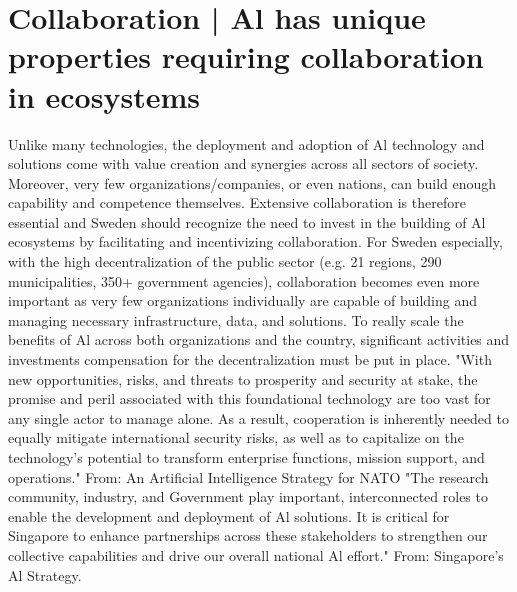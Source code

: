 \section*{Collaboration | Al has unique properties requiring collaboration in ecosystems}
Unlike many technologies, the deployment and adoption of Al technology and solutions come with value creation and synergies across all sectors of society. Moreover, very few organizations/companies, or even nations, can build enough capability and competence themselves. Extensive collaboration is therefore essential and Sweden should recognize the need to invest in the building of Al ecosystems by facilitating and incentivizing collaboration.
For Sweden especially, with the high decentralization of the public sector (e.g. 21 regions, 290 municipalities, 350+ government agencies), collaboration becomes even more important as very few organizations individually are capable of building and managing necessary infrastructure, data, and solutions. To really scale the benefits of Al across both organizations and the country, significant activities and investments compensation for the decentralization must be put in place.
"With new opportunities, risks, and threats to prosperity and security at stake, the promise and peril associated with this foundational technology are too vast for any single actor to manage alone. As a result, cooperation is inherently needed to equally mitigate international security risks, as well as to capitalize on the technology's potential to transform enterprise functions, mission support, and operations."
From: An Artificial Intelligence Strategy for NATO
"The research community, industry, and Government play important, interconnected roles to enable the development and deployment of Al solutions. It is critical for Singapore to enhance partnerships across these stakeholders to strengthen our collective capabilities and drive our overall national Al effort." From: Singapore's Al Strategy.

